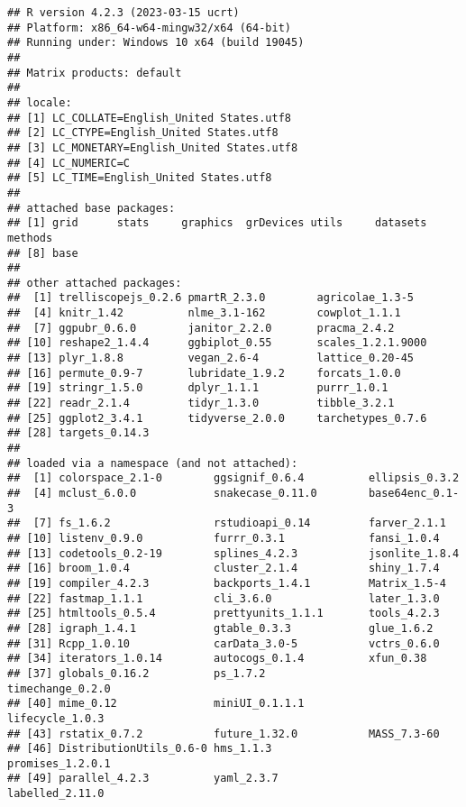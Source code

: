 \documentclass[
]{article}
\begin{document}
\begin{verbatim}
## R version 4.2.3 (2023-03-15 ucrt)
## Platform: x86_64-w64-mingw32/x64 (64-bit)
## Running under: Windows 10 x64 (build 19045)
## 
## Matrix products: default
## 
## locale:
## [1] LC_COLLATE=English_United States.utf8 
## [2] LC_CTYPE=English_United States.utf8   
## [3] LC_MONETARY=English_United States.utf8
## [4] LC_NUMERIC=C                          
## [5] LC_TIME=English_United States.utf8    
## 
## attached base packages:
## [1] grid      stats     graphics  grDevices utils     datasets  methods  
## [8] base     
## 
## other attached packages:
##  [1] trelliscopejs_0.2.6 pmartR_2.3.0        agricolae_1.3-5    
##  [4] knitr_1.42          nlme_3.1-162        cowplot_1.1.1      
##  [7] ggpubr_0.6.0        janitor_2.2.0       pracma_2.4.2       
## [10] reshape2_1.4.4      ggbiplot_0.55       scales_1.2.1.9000  
## [13] plyr_1.8.8          vegan_2.6-4         lattice_0.20-45    
## [16] permute_0.9-7       lubridate_1.9.2     forcats_1.0.0      
## [19] stringr_1.5.0       dplyr_1.1.1         purrr_1.0.1        
## [22] readr_2.1.4         tidyr_1.3.0         tibble_3.2.1       
## [25] ggplot2_3.4.1       tidyverse_2.0.0     tarchetypes_0.7.6  
## [28] targets_0.14.3     
## 
## loaded via a namespace (and not attached):
##  [1] colorspace_2.1-0        ggsignif_0.6.4          ellipsis_0.3.2         
##  [4] mclust_6.0.0            snakecase_0.11.0        base64enc_0.1-3        
##  [7] fs_1.6.2                rstudioapi_0.14         farver_2.1.1           
## [10] listenv_0.9.0           furrr_0.3.1             fansi_1.0.4            
## [13] codetools_0.2-19        splines_4.2.3           jsonlite_1.8.4         
## [16] broom_1.0.4             cluster_2.1.4           shiny_1.7.4            
## [19] compiler_4.2.3          backports_1.4.1         Matrix_1.5-4           
## [22] fastmap_1.1.1           cli_3.6.0               later_1.3.0            
## [25] htmltools_0.5.4         prettyunits_1.1.1       tools_4.2.3            
## [28] igraph_1.4.1            gtable_0.3.3            glue_1.6.2             
## [31] Rcpp_1.0.10             carData_3.0-5           vctrs_0.6.0            
## [34] iterators_1.0.14        autocogs_0.1.4          xfun_0.38              
## [37] globals_0.16.2          ps_1.7.2                timechange_0.2.0       
## [40] mime_0.12               miniUI_0.1.1.1          lifecycle_1.0.3        
## [43] rstatix_0.7.2           future_1.32.0           MASS_7.3-60            
## [46] DistributionUtils_0.6-0 hms_1.1.3               promises_1.2.0.1       
## [49] parallel_4.2.3          yaml_2.3.7              labelled_2.11.0        

\end{verbatim}
\end{document}
